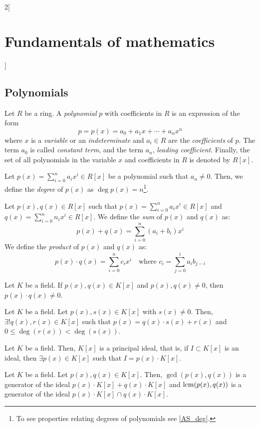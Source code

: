 \documentclass[../../../main.tex]{subfiles}
\begin{document}
\begin{multicols}{2}[\section{Fundamentals of mathematics}]
  \subsection{Polynomials}
  \begin{definition}
    Let $R$ be a ring. A \emph{polynomial} $p$ with coefficients in $R$ is an expression of the form $$p=p(x)=a_0+a_1x+\cdots+a_nx^n$$ where $x$ is a \emph{variable} or an \emph{indeterminate} and $a_i\in R$ are the \emph{coefficients} of $p$. The term $a_0$ is called \emph{constant term}, and the term $a_n$, \emph{leading coefficient}. Finally, the set of all polynomials in the variable $x$ and coefficients in $R$ is denoted by $R[x]$.
  \end{definition}
  \begin{definition}
    Let $p(x)=\sum_{i=0}^na_ix^i\in R[x]$ be a polynomial such that $a_n\ne 0$. Then, we define the \emph{degree} of $p(x)$ as $\deg p(x)=n$\footnote{To see properties relating degrees of polynomials see \cref{AS_deg}.}.
  \end{definition}
  \begin{definition}
    Let $p(x),q(x)\in R[x]$ such that $p(x)=\sum_{i=0}^na_ix^i\in R[x]$ and $q(x)=\sum_{i=0}^nn_ix^i\in R[x]$. We define the \emph{sum} of $p(x)$ and $q(x)$ as: $$p(x)+q(x)=\sum_{i=0}^n(a_i+b_i)x^i$$
    We define the \emph{product} of $p(x)$ and $q(x)$ as: $$p(x)\cdot q(x)=\sum_{i=0}^nc_ix^i\quad\text{where } c_i=\sum_{j=0}^ia_ib_{j-i}$$
  \end{definition}
  \begin{proposition}
    Let $K$ be a field. If $p(x),q(x)\in K[x]$ and $p(x),q(x)\ne 0$, then $p(x)\cdot q(x)\ne 0$.
  \end{proposition}
  \begin{theorem}
    Let $K$ be a field. Let $p(x),s(x)\in K[x]$ with $s(x)\ne 0$. Then, $\exists! q(x),r(x)\in K[x]$ such that $p(x)=q(x)\cdot s(x)+r(x)$ and $0\leq\deg(r(x))<\deg(s(x))$.
  \end{theorem}
  \begin{theorem}
    Let $K$ be a field. Then, $K[x]$ is a principal ideal, that is, if $I\subset K[x]$ is an ideal, then $\exists p(x)\in K[x]$ such that $I=p(x)\cdot K[x]$.
  \end{theorem}
  \begin{definition}
    Let $K$ be a field. Let $p(x),q(x)\in K[x]$. Then, $\gcd(p(x),q(x))$ is a generator of the ideal $p(x)\cdot K[x]+q(x)\cdot K[x]$ and $\operatorname{lcm}(p(x),q(x))$ is a generator of the ideal $p(x)\cdot K[x]\cap q(x)\cdot K[x]$.

\end{definition}
\end{multicols}
\end{document}
